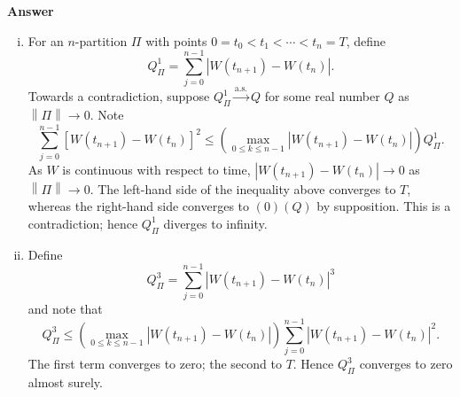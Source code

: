 \documentclass[11pt]{article}
\newcommand\norm[1]{\left\lVert#1\right\rVert}
\newenvironment{hwanswer}
    {
        \vspace{2mm}
        {\bfseries Answer}
        \vspace{-\abovedisplayskip}
        \begin{center}
            \begin{tcolorbox}[
                width=0.95\textwidth,
                colback=white,
                colframe=white,
                opacityback=0,
                opacityframe=0,
                boxrule=0pt,
                frame hidden,
                breakable,
                before upper={\parindent15pt} %
            ]
            \lineskip=0pt %
    }
    {
        \end{tcolorbox}
        \end{center}
        \vspace{4mm}
    }
\begin{document}
    \begin{hwanswer}
        \begin{enumerate}[(i)]
            \item For an $n$-partition $\Pi$ with points $0 = t_0 < t_1 < \cdots < t_n = T$,
            define
            \[
                Q_{\Pi}^{1}
                =
                \sum_{j=0}^{n-1} | W(t_{n+1}) - W(t_{n}) |.
            \]
            Towards a contradiction, suppose $Q_{\Pi}^{1} \xrightarrow{\text{a.s.}} Q$ for
            some real number $Q$ as $\norm{\Pi} \to 0$. Note
            \[
                \sum_{j=0}^{n-1}
                \left[ W(t_{n+1}) - W(t_{n}) \right]^2
                \leq
                \left(
                    \max_{0 \leq k \leq n - 1}
                    |W(t_{n+1}) - W(t_{n})|
                \right)
                Q_{\Pi}^{1}.
            \]
            As $W$ is continuous with respect to time, $|W(t_{n+1}) - W(t_{n})| \to 0$ as
            $\norm{\Pi} \to 0$. The left-hand side of the inequality above converges to $T$,
            whereas the right-hand side converges to $(0) (Q)$ by supposition. This is a
            contradiction; hence $Q_{\Pi}^{1}$ diverges to infinity.

            \item Define
            \[
                Q_{\Pi}^{3}
                =
                \sum_{j=0}^{n-1} |W(t_{n+1}) - W(t_n)|^3
            \]
            and note that
            \[
                Q_{\Pi}^{3}
                \leq
                \left(
                    \max_{0 \leq k \leq n - 1}
                    |W(t_{n+1}) - W(t_{n})|
                \right)
                \sum_{j=0}^{n-1} |W(t_{n+1}) - W(t_n)|^2.
            \]
            The first term converges to zero; the second to $T$. Hence $Q_{\Pi}^{3}$
            converges to zero almost surely.
        \end{enumerate}
    \end{hwanswer}
\end{document}

